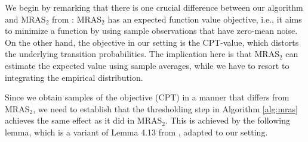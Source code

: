 
We begin by remarking that there is one crucial difference between our algorithm and MRAS$_2$ from \cite{chang2013simulation}:
MRAS$_2$ has an expected function value objective, i.e., it aims to minimize a function by using sample observations that have zero-mean noise. On the other hand, the objective in our setting is the CPT-value, which distorts the underlying transition probabilities. The implication here is that MRAS$_2$ can estimate the expected value using sample averages, while we have to resort to integrating the empirical distribution.

Since we obtain samples of the objective (CPT) in a manner that differs from MRAS$_2$, we need to establish that the thresholding step in Algorithm \ref{alg:mras} achieves the same effect as it did in MRAS$_2$. This is achieved by the following lemma, which is a variant of Lemma 4.13 from \cite{chang2013simulation}, adapted to our setting. 


